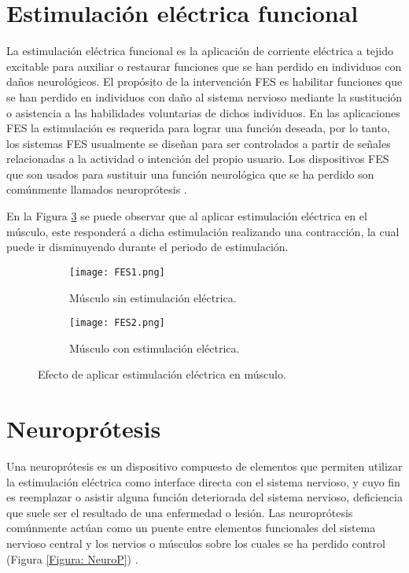 
\section{Estimulación eléctrica funcional}
La estimulación eléctrica funcional es la aplicación de corriente eléctrica a tejido excitable para auxiliar o restaurar funciones que se han perdido en individuos con daños neurológicos. El propósito de la intervención FES es habilitar funciones que se han perdido en individuos con daño al sistema nervioso mediante la sustitución o asistencia a las habilidades voluntarias de dichos individuos. En las aplicaciones FES la estimulación es requerida para lograr una función deseada, por lo tanto, los sistemas FES usualmente se diseñan para ser controlados a partir de señales relacionadas a la actividad o intención del propio usuario. Los dispositivos FES que son usados para sustituir una función neurológica que se ha perdido son comúnmente llamados neuroprótesis \cite{Peckham2005}.

En la Figura \ref{Figura: FES} se puede observar que al aplicar estimulación eléctrica en el músculo, este responderá a dicha estimulación realizando una contracción, la cual puede ir disminuyendo durante el periodo de estimulación.

\begin{figure}[htbp]
	\centering
	\begin{subfigure}[htbp]{0.4\textwidth}
		\centering
		\texttt{[image: FES1.png]}
		\caption{Músculo sin estimulación eléctrica.}
		\label{Figura: FES1}
	\end{subfigure}
	\hfill
	\begin{subfigure}[htbp]{0.4\textwidth}
		\centering
		\texttt{[image: FES2.png]}
		\caption{Músculo con estimulación eléctrica.}
		\label{Figura: FES2}
	\end{subfigure}
	\caption[Efecto de aplicar estimulación eléctrica en músculo]{Efecto de aplicar estimulación eléctrica en músculo.}
	\label{Figura: FES}
\end{figure}

\section{Neuroprótesis}
Una neuroprótesis es un dispositivo compuesto de elementos que permiten utilizar la estimulación eléctrica como interface directa con el sistema nervioso, y cuyo fin es reemplazar o asistir alguna función deteriorada del sistema nervioso, deficiencia que suele ser el resultado de una enfermedad o lesión. Las neuroprótesis comúnmente actúan como un puente entre elementos funcionales del sistema nervioso central y los nervios o músculos sobre los cuales se ha perdido control (Figura \ref{Figura: NeuroP}) \cite{Finn2003}\cite{Popovic2008}.


